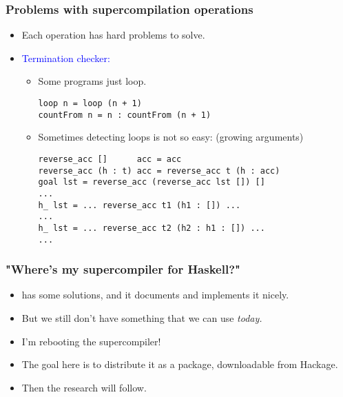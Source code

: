 \documentclass{beamer}
\begin{document}
\begin{frame}[fragile]
    \frametitle{Problems with supercompilation operations}

    \begin{itemize}[<+->]

        \item[]
            Each operation has hard problems to solve.

        \item[]
            \textcolor{blue}{Termination checker:}

            \begin{itemize}

                \item[]
                    Some programs just loop.

                    \begin{verbatim}
loop n = loop (n + 1)
countFrom n = n : countFrom (n + 1)
                    \end{verbatim}

                \item[]
                    Sometimes detecting loops is not so easy: (growing
                    arguments)

                    \begin{verbatim}
reverse_acc []      acc = acc
reverse_acc (h : t) acc = reverse_acc t (h : acc)
goal lst = reverse_acc (reverse_acc lst []) []
...
h_ lst = ... reverse_acc t1 (h1 : []) ...
...
h_ lst = ... reverse_acc t2 (h2 : h1 : []) ...
...
                    \end{verbatim}

            \end{itemize}

    \end{itemize}
\end{frame}

\begin{frame}
    \frametitle{"Where's my supercompiler for Haskell?"}

    \begin{itemize}[<+->]
        \item
            \citet{callbyneed-sc} has some solutions, and it documents and
            implements it nicely.

        \item
            But we still don't have something that we can use \textit{today.}

        \item
            I'm rebooting the supercompiler!

        \item
            The goal here is to distribute it as a package, downloadable from
            Hackage.

        \item
            Then the research will follow.
    \end{itemize}
\end{frame}
\end{document}
